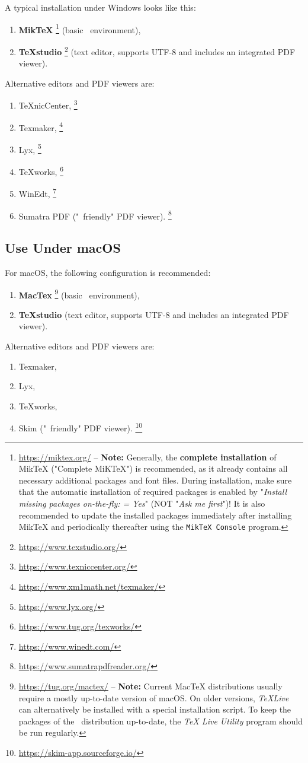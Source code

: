 A typical installation under Windows looks like this:
%
\begin{enumerate}
\item \textbf{MikTeX}%
	\footnote{\url{https://miktex.org/} -- \textbf{Note:}
	Generally, the \textbf{complete installation} of MikTeX ("Complete MiKTeX") is 
	recommended, as it already contains all necessary additional packages and font files.
	During installation, make sure that the automatic installation of required packages
	is enabled by "\emph{Install missing packages on-the-fly: = Yes}" 
	(NOT "\emph{Ask me first}")!
	It is also recommended to update the installed packages immediately after installing MikTeX 
	and periodically thereafter using the \texttt{MikTeX Console} program.} 
	(basic \latex\ environment),
\item \textbf{TeXstudio}%
	\footnote{\url{https://www.texstudio.org/}}
	(text editor, supports UTF-8 and includes an integrated PDF viewer).
\end{enumerate}
%
Alternative editors and PDF viewers are:
%
\begin{enumerate}
	\item TeXnicCenter,%
	\footnote{\url{https://www.texniccenter.org/}}
	\item Texmaker,%
	\footnote{\url{https://www.xm1math.net/texmaker/}}
	\item Lyx,%
	\footnote{\url{https://www.lyx.org/}}
	\item TeXworks,%
	\footnote{\url{https://www.tug.org/texworks/}}
	\item WinEdt,%
	\footnote{\url{https://www.winedt.com/}}
	\item Sumatra PDF ("\latex\ friendly" PDF viewer).%
	\footnote{\url{https://www.sumatrapdfreader.org/}}
\end{enumerate}


\subsection{Use Under macOS}

For macOS, the following configuration is recommended:
%
\begin{enumerate}
\item 
	\textbf{MacTex}%
	\footnote{\url{https://tug.org/mactex/} -- \textbf{Note:}
	Current MacTeX distributions usually require a mostly up-to-date version of macOS. 
	On older versions, \emph{TeXLive} can alternatively be installed with a special
	installation script. To keep the packages of the \latex\ distribution up-to-date, the 
	\emph{TeX Live Utility} program should be run regularly.}
	(basic \latex\ environment),
\item \textbf{TeXstudio} (text editor, supports UTF-8 and includes an integrated PDF viewer).
\end{enumerate}
%
Alternative editors and PDF viewers are:
%
\begin{enumerate}
	\item Texmaker,%
	\item Lyx,%
	\item TeXworks,%
	\item Skim ("\latex\ friendly" PDF viewer).%
	\footnote{\url{https://skim-app.sourceforge.io/}}
\end{enumerate}



